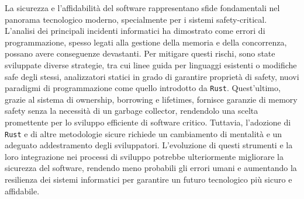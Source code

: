 La sicurezza e l'affidabilità del software rappresentano sfide fondamentali nel panorama tecnologico moderno, specialmente per i sistemi safety-critical. L'analisi dei principali incidenti informatici ha dimostrato come errori di programmazione, spesso legati alla gestione della memoria e della concorrenza, possano avere conseguenze devastanti. Per mitigare questi rischi, sono state sviluppate diverse strategie, tra cui linee guida per linguaggi esistenti o modifiche safe degli stessi, analizzatori statici in grado di garantire proprietà di safety, nuovi paradigmi di programmazione come quello introdotto da \texttt{Rust}. Quest'ultimo, grazie al sistema di ownership, borrowing e lifetimes, fornisce garanzie di memory safety senza la necessità di un garbage collector, rendendolo una scelta promettente per lo sviluppo efficiente di software critico. Tuttavia, l'adozione di \texttt{Rust} e di altre metodologie sicure richiede un cambiamento di mentalità e un adeguato addestramento degli sviluppatori. L'evoluzione di questi strumenti e la loro integrazione nei processi di sviluppo potrebbe ulteriormente migliorare la sicurezza del software, rendendo meno probabili gli errori umani e aumentando la resilienza dei sistemi informatici per garantire un futuro tecnologico più sicuro e affidabile.

